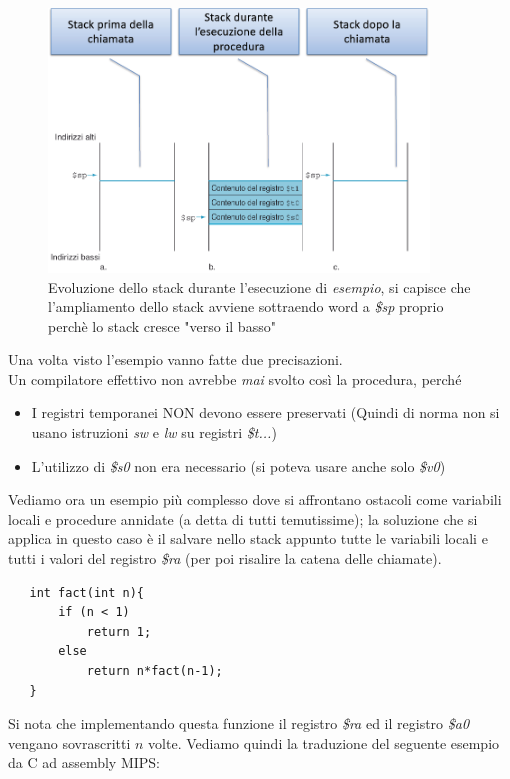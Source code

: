 \documentclass[class=book, crop=false]{standalone}
\begin{document}
\begin{figure}[H]
	\centering
	\caption{Evoluzione dello stack durante l'esecuzione di \emph{esempio}, si capisce che l'ampliamento dello stack avviene sottraendo word a \emph{\$sp} proprio perchè lo stack cresce "verso il basso"}
	\includegraphics[width=0.9\textwidth,keepaspectratio]{Evoluzione-stack}
\end{figure}

Una volta visto l'esempio vanno fatte due precisazioni.\\
Un compilatore effettivo non avrebbe \emph{mai} svolto così la procedura, perché
\begin{itemize}[nolistsep, noitemsep]
	\item I registri temporanei NON devono essere preservati (Quindi di norma non si usano istruzioni \emph{sw} e \emph{lw} su registri \emph{\$t...})
	\item L'utilizzo di \emph{\$s0} non era necessario (si poteva usare anche solo \emph{\$v0})
\end{itemize}

Vediamo ora un esempio più complesso dove si affrontano ostacoli come variabili locali e procedure annidate (a detta di tutti temutissime); la soluzione che si applica in questo caso è il salvare nello stack appunto tutte le variabili locali e tutti i valori del registro \emph{\$ra} (per poi risalire la catena delle chiamate).

\begin{verbatim}
   int fact(int n){
	   if (n < 1)
		   return 1;
	   else
		   return n*fact(n-1);
   }
\end{verbatim}

Si nota che implementando questa funzione il registro \emph{\$ra} ed il registro \emph{\$a0} vengano sovrascritti $n$ volte.
Vediamo quindi la traduzione del seguente esempio da C ad assembly MIPS:
\end{document}
